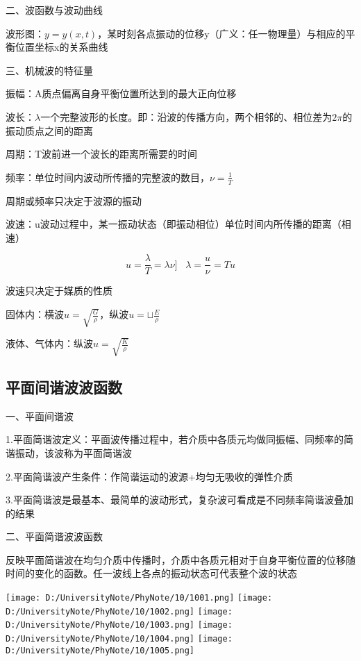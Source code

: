 \documentclass[UTF8]{article}
\begin{document}
    二、波函数与波动曲线

    波形图：$y = y(x,t)$，某时刻各点振动的位移y（广义：任一物理量）与相应的平衡位置坐标x的关系曲线

    三、机械波的特征量

    振幅：A\;\;质点偏离自身平衡位置所达到的最大正向位移

    波长：$\lambda$\;\;一个完整波形的长度。即：沿波的传播方向，两个相邻的、相位差为$2\pi$的振动质点之间的距离

    周期：T\;\;波前进一个波长的距离所需要的时间

    频率：单位时间内波动所传播的完整波的数目，$\nu = \frac{1}{T}$

    周期或频率只决定于波源的振动

    波速：u\;\;波动过程中，某一振动状态（即振动相位）单位时间内所传播的距离（相速）

    \[u = \frac{\lambda}{T} = \lambda\nu]\;\;\;\lambda = \frac{u}{\nu} = Tu\]

    波速只决定于媒质的性质

    固体内：横波\;$u = \sqrt{\frac{G}{\rho}}$，纵波\;$u = \sqcup\frac{E}{\rho}$

    液体、气体内：纵波\;$u = \sqrt{\frac{K}{\rho}}$

\subsection{平面间谐波波函数}

    一、平面间谐波

    1.平面简谐波定义：平面波传播过程中，若介质中各质元均做同振幅、同频率的简谐振动，该波称为平面简谐波

    2.平面简谐波产生条件：作简谐运动的波源\;+\;均匀无吸收的弹性介质

    3.平面简谐波是最基本、最简单的波动形式，复杂波可看成是不同频率简谐波叠加的结果

    二、平面简谐波波函数

    反映平面简谐波在均匀介质中传播时，介质中各质元相对于自身平衡位置的位移随时间的变化的函数。任一波线上各点的振动状态可代表整个波的状态

    \texttt{[image: D:/UniversityNote/PhyNote/10/1001.png]}
    \texttt{[image: D:/UniversityNote/PhyNote/10/1002.png]}
    \texttt{[image: D:/UniversityNote/PhyNote/10/1003.png]}
    \texttt{[image: D:/UniversityNote/PhyNote/10/1004.png]}
    \texttt{[image: D:/UniversityNote/PhyNote/10/1005.png]}
\end{document}
